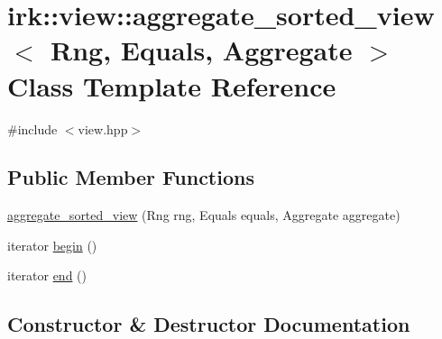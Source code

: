 \hypertarget{classirk_1_1view_1_1aggregate__sorted__view}{}\section{irk\+:\+:view\+:\+:aggregate\+\_\+sorted\+\_\+view$<$ Rng, Equals, Aggregate $>$ Class Template Reference}
\label{classirk_1_1view_1_1aggregate__sorted__view}


{\ttfamily \#include $<$view.\+hpp$>$}

\subsection*{Public Member Functions}
\begin{DoxyCompactItemize}
\item 
\mbox{\hyperlink{classirk_1_1view_1_1aggregate__sorted__view_ade1b418bcab06f13a982e049db7c38db}{aggregate\+\_\+sorted\+\_\+view}} (Rng rng, Equals equals, Aggregate aggregate)
\item 
iterator \mbox{\hyperlink{classirk_1_1view_1_1aggregate__sorted__view_af3bf35b32e950446e57c20368ee36f8a}{begin}} ()
\item 
iterator \mbox{\hyperlink{classirk_1_1view_1_1aggregate__sorted__view_ae4e1532ad4e90508404311f47c6de00f}{end}} ()
\end{DoxyCompactItemize}


\subsection{Constructor \& Destructor Documentation}
\mbox{\label{classirk_1_1view_1_1aggregate__sorted__view_ade1b418bcab06f13a982e049db7c38db}} 
